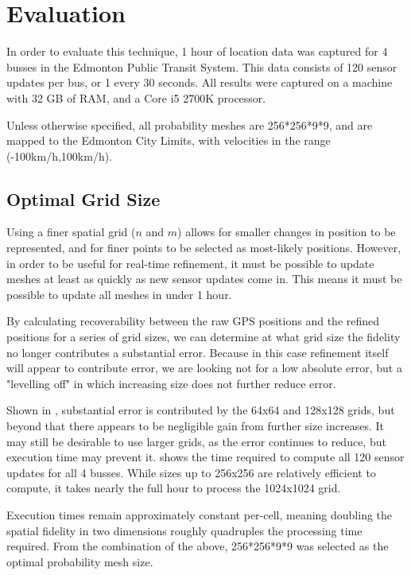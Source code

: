 \section{Evaluation}

In order to evaluate this technique, 1 hour of location data was captured for 4 busses in the Edmonton Public Transit System. This data consists of 120 sensor updates per bus, or 1 every 30 seconds. All results were captured on a machine with 32 GB of RAM, and a Core i5 2700K processor.

Unless otherwise specified, all probability meshes are 256*256*9*9, and are mapped to the Edmonton City Limits, with velocities in the range (-100km/h,100km/h).

\subsection{Optimal Grid Size}
Using a finer spatial grid ($n$ and $m$) allows for smaller changes in position to be represented, and for finer points to be selected as most-likely positions.
However, in order to be useful for real-time refinement, it must be possible to update meshes at least as quickly as new sensor updates come in. This means it must be possible to update all meshes in under 1 hour.

By calculating recoverability between the raw GPS positions and the refined positions for a series of grid sizes, we can determine at what grid size the fidelity no longer contributes a substantial error. Because in this case refinement itself will appear to contribute error, we are looking not for a low absolute error, but a "levelling off" in which increasing size does not further reduce error.



Shown in , substantial error is contributed by the 64x64 and 128x128 grids, but beyond that there appears to be negligible gain from further size increases. It may still be desirable to use larger grids, as the error continues to reduce, but execution time may prevent it.  shows the time required to compute all 120 sensor updates for all 4 busses. While sizes up to 256x256 are relatively efficient to compute, it takes nearly the full hour to process the 1024x1024 grid.



Execution times remain approximately constant per-cell, meaning doubling the spatial fidelity in two dimensions roughly quadruples the processing time required. From the combination of the above, 256*256*9*9 was selected as the optimal probability mesh size.

